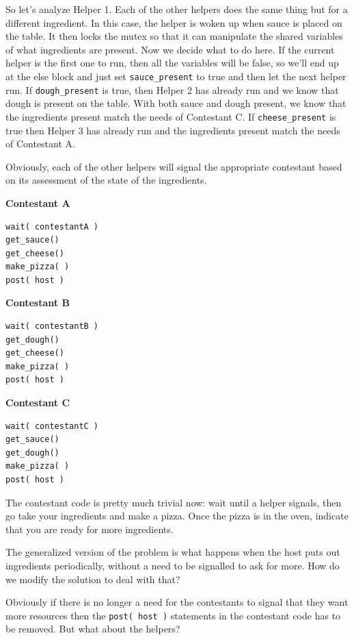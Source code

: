 \documentclass[a4paper]{report}
\begin{document}
So let's analyze Helper 1. Each of the other helpers does the same thing but for a different ingredient. In this case, the helper is woken up when sauce is placed on the table. It then locks the mutex so that it can manipulate the shared variables of what ingredients are present. Now we decide what to do here. If the current helper is the first one to run, then all the variables will be false, so we'll end up at the else block and just set \texttt{sauce\_present} to true and then let the next helper run. If \texttt{dough\_present} is true, then Helper 2 has already run and we know that dough is present on the table. With both sauce and dough present, we know that the ingredients present match the needs of Contestant C. If \texttt{cheese\_present} is true then Helper 3 has already run and the ingredients present match the needs of Contestant A.

Obviously, each of the other helpers will signal the appropriate contestant based on its assessment of the state of the ingredients.

\begin{multicols}{3}
	\textbf{Contestant A}
	\begin{lstlisting}
wait( contestantA )
get_sauce()
get_cheese()
make_pizza( )
post( host )
\end{lstlisting}
	\columnbreak
	\textbf{Contestant B}
	\begin{lstlisting}
wait( contestantB )
get_dough()
get_cheese()
make_pizza( )
post( host )
\end{lstlisting}
	\columnbreak
	\textbf{Contestant C}
	\begin{lstlisting}
wait( contestantC )
get_sauce()
get_dough()
make_pizza( )
post( host )
\end{lstlisting}
\end{multicols}

The contestant code is pretty much trivial now: wait until a helper signals, then go take your ingredients and make a pizza. Once the pizza is in the oven, indicate that you are ready for more ingredients.

The generalized version of the problem is what happens when the host puts out ingredients periodically, without a need to be signalled to ask for more. How do we modify the solution to deal with that?

Obviously if there is no longer a need for the contestants to signal that they want more resources then the \texttt{post( host )} statements in the contestant code has to be removed. But what about the helpers?
\end{document}
